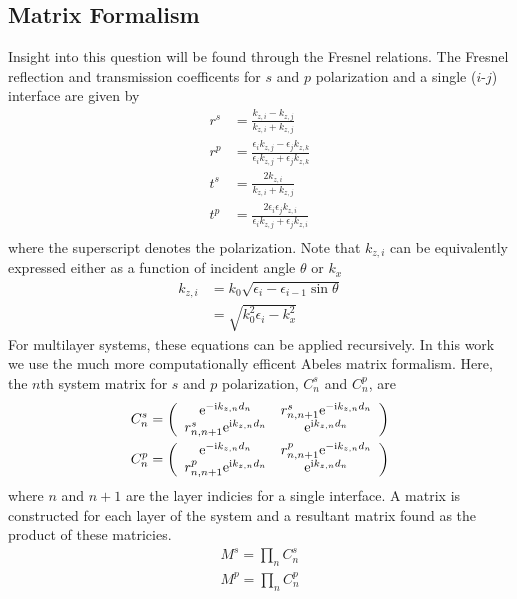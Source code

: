 \subsection{Matrix Formalism}
Insight into this question will be found through the Fresnel
relations.  The Fresnel reflection and transmission coefficents for $s$ and
$p$ polarization and a single ($i$-$j$) interface are given by
\begin{align}
r^s &= \frac{k_{z,i}-k_{z,j}}{k_{z,i}+k_{z,j}}\\
r^p &= \frac{\epsilon_i k_{z,j} - \epsilon_j k_{z,k}}{\epsilon_i k_{z,j} + \epsilon_j k_{z,k}} \\
t^s &= \frac{2 k_{z,i}}{k_{z,i}+k_{z,j}}\\
t^p &= \frac{2 \epsilon_i \epsilon_j k_{z,i}}{\epsilon_i k_{z,j} + \epsilon_j k_{z,i}}\\
\end{align}
where the superscript denotes the polarization.
Note that $k_{z,i}$ can be equivalently expressed either as a
function of incident angle $\theta$ or $k_x$
\begin{align}
 k_{z,i} &= k_0 \sqrt{\epsilon_i - \epsilon_{i-1} \sin \theta}\\
&= \sqrt{k_0^2\epsilon_i - k_x^2}
\end{align}
For multilayer systems, these equations can be applied recursively. In 
this work we use the much more computationally efficent 
Abeles matrix formalism.  Here, the $n$th system matrix for $s$ and $p$
polarization, $C^s_n$ and $C^p_n$, are
\begin{align}
C^s_n = \left(\begin{array}{cc}
{\mathrm{e}}^{-{\mathrm{i}} k_{z,n} d_n} & r^s_{n,n+1} {\mathrm{e}}^{-{\mathrm{i}} k_{z,n} d_n} \\
r^s_{n,n+1} {\mathrm{e}}^{{\mathrm{i}} k_{z,n} d_n} & {\mathrm{e}}^{{\mathrm{i}} k_{z,n} d_n} 
\end{array}\right)\\
C^p_n = \left(\begin{array}{cc}
{\mathrm{e}}^{-{\mathrm{i}} k_{z,n} d_n} & r^p_{n,n+1} {\mathrm{e}}^{-{\mathrm{i}} k_{z,n} d_n} \\
r^p_{n,n+1} {\mathrm{e}}^{{\mathrm{i}} k_{z,n} d_n} & {\mathrm{e}}^{{\mathrm{i}} k_{z,n} d_n} 
\end{array}\right)
\end{align}
where $n$ and $n+1$ are the layer indicies for a single interface.  A
matrix is constructed for each layer of the system and a resultant matrix
found as the product of these matricies.
\begin{align}
M^s=\prod_n C^s_n\\
M^p=\prod_n C^p_n
\end{align}

